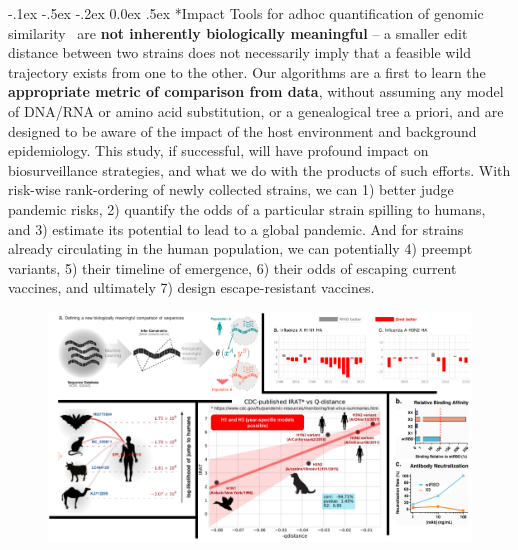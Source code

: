 \documentclass[onecolumn, compsoc,12pt]{IEEEtran}
\makeatletter
\renewcommand\paragraph{\@startsection {section}{1}{\z@}%
                                   {-.1ex \@plus -.5ex \@minus -.2ex}%
                                   {0.0ex \@plus.5ex}%
                                   {\fontsize{11}{10}\selectfont\bfseries\itshape\sffamily\color{black}}}
\def\hcov{SARS-CoV-2\xspace}
\def\cov{COVID-19\xspace}
\def\infl{Influenza A\xspace}
\makeatother
\begin{document}
\paragraph*{Impact}  Tools for adhoc quantification of genomic similarity~\cite{posada1998modeltest,goldberger2005genomic,huelsenbeck1997phylogeny,neher2014predicting,VanderMeer2010,Smith2009} are \textbf{not inherently biologically meaningful} -- a smaller edit distance between two strains  does not necessarily imply that a feasible wild trajectory exists from one to the other.  Our  algorithms are a first to learn the \textbf{appropriate metric of comparison from data}, without assuming any model of DNA/RNA or amino acid substitution, or a genealogical tree a priori, and are  designed to be aware of the impact of the  host environment and background epidemiology. %
This study, if successful, will have profound impact on  biosurveillance strategies, and what we do with the products of such efforts. With  risk-wise rank-ordering of  newly collected strains, we can  1) better judge pandemic risks, 2) quantify the odds of a particular strain spilling to humans, and 3) estimate its potential to lead to a global pandemic. And for strains already circulating in the human population, we can potentially  4) preempt variants, 5) their timeline of emergence,  6) their odds of escaping current vaccines, and ultimately 7) design escape-resistant vaccines. %

\begin{figure}[!ht]
\includegraphics[width=.9\textwidth]{Figures/fig}
\end{figure}
\end{document}
